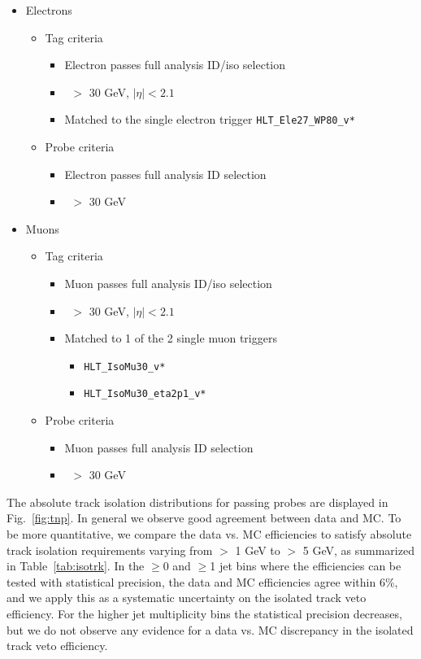 \begin{itemize}
  \item{Electrons}

    \begin{itemize}
    \item{Tag criteria}

      \begin{itemize}
      \item Electron passes full analysis ID/iso selection 
      \item \pt\ $>$ 30 GeV, $|\eta|<2.1$ 
      \item Matched to the single electron trigger \verb=HLT_Ele27_WP80_v*=
      \end{itemize}

    \item{Probe criteria}
      \begin{itemize}
      \item Electron passes full analysis ID selection
      \item \pt\ $>$ 30 GeV
      \end{itemize}
      \end{itemize}
  \item{Muons}
    \begin{itemize}
    \item{Tag criteria}
      \begin{itemize}
      \item Muon passes full analysis ID/iso selection
      \item \pt\ $>$ 30 GeV, $|\eta|<2.1$
      \item Matched to 1 of the 2 single muon triggers
        \begin{itemize}
        \item \verb=HLT_IsoMu30_v*=
        \item \verb=HLT_IsoMu30_eta2p1_v*=
        \end{itemize}
      \end{itemize}
    \item{Probe criteria}
      \begin{itemize}
      \item Muon passes full analysis ID selection
      \item \pt\ $>$ 30 GeV
      \end{itemize}
    \end{itemize}
\end{itemize}

The absolute track isolation distributions for passing probes are displayed in Fig.~\ref{fig:tnp}. In general we observe
good agreement between data and MC. To be more quantitative, we compare the data vs. MC efficiencies to satisfy
absolute track isolation requirements varying from $>$ 1 GeV to $>$ 5 GeV, as summarized in Table~\ref{tab:isotrk}.
In the $\geq$0 and $\geq$1 jet bins where the efficiencies can be tested with statistical precision, the data and MC
efficiencies agree within 6\%, and we apply this as a systematic uncertainty on the isolated track veto efficiency.
For the higher jet multiplicity bins the statistical precision decreases, but we do not observe any evidence for
a data vs. MC discrepancy in the isolated track veto efficiency.


